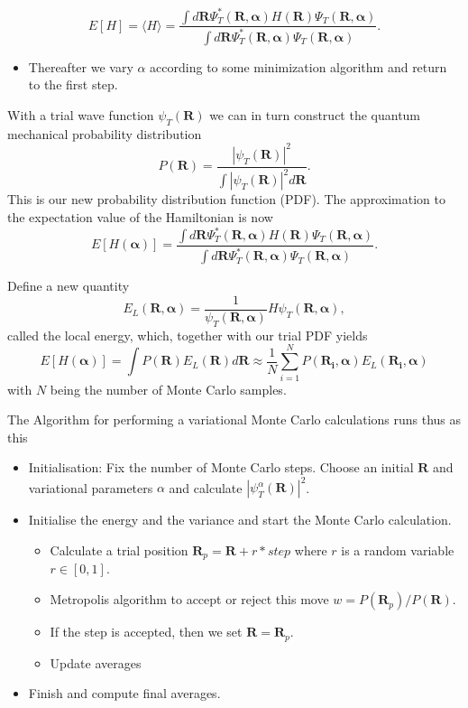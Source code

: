 \documentclass[%
oneside,                 %
final,                   %
10pt]{article}
\begin{document}
\noindent
\[
   E[H]=\langle H \rangle =
   \frac{\int d\bm{R}\Psi^{\ast}_{T}(\bm{R},\bm{\alpha})H(\bm{R})\Psi_{T}(\bm{R},\bm{\alpha})}
        {\int d\bm{R}\Psi^{\ast}_{T}(\bm{R},\bm{\alpha})\Psi_{T}(\bm{R},\bm{\alpha})}.
\]
\begin{itemize}
\item Thereafter we vary $\alpha$ according to some minimization algorithm and return to the first step.
\end{itemize}

\noindent
With a trial wave function $\psi_T(\bm{R})$ we can in turn construct the quantum mechanical probability distribution
\[
   P(\bm{R})= \frac{\left|\psi_T(\bm{R})\right|^2}{\int \left|\psi_T(\bm{R})\right|^2d\bm{R}}.
\]
This is our new probability distribution function  (PDF).
The approximation to the expectation value of the Hamiltonian is now 
\[
   E[H(\bm{\alpha})] = 
   \frac{\int d\bm{R}\Psi^{\ast}_T(\bm{R},\bm{\alpha})H(\bm{R})\Psi_T(\bm{R},\bm{\alpha})}
        {\int d\bm{R}\Psi^{\ast}_T(\bm{R},\bm{\alpha})\Psi_T(\bm{R},\bm{\alpha})}.
\]

Define a new quantity
\[
   E_L(\bm{R},\bm{\alpha})=\frac{1}{\psi_T(\bm{R},\bm{\alpha})}H\psi_T(\bm{R},\bm{\alpha}),
   \label{eq:locale1}
\]
called the local energy, which, together with our trial PDF yields
\[
  E[H(\bm{\alpha})]=\int P(\bm{R})E_L(\bm{R}) d\bm{R}\approx \frac{1}{N}\sum_{i=1}^NP(\bm{R_i},\bm{\alpha})E_L(\bm{R_i},\bm{\alpha})
  \label{eq:vmc1}
\]
with $N$ being the number of Monte Carlo samples.

The Algorithm for performing a variational Monte Carlo calculations runs thus as this

\begin{itemize}
   \item Initialisation: Fix the number of Monte Carlo steps. Choose an initial $\bm{R}$ and variational parameters $\alpha$ and calculate $\left|\psi_T^{\alpha}(\bm{R})\right|^2$. 

   \item Initialise the energy and the variance and start the Monte Carlo calculation.
\begin{itemize}

      \item Calculate  a trial position  $\bm{R}_p=\bm{R}+r*step$ where $r$ is a random variable $r \in [0,1]$.

      \item Metropolis algorithm to accept or reject this move  $w = P(\bm{R}_p)/P(\bm{R})$.

      \item If the step is accepted, then we set $\bm{R}=\bm{R}_p$. 

      \item Update averages

\end{itemize}

\noindent
   \item Finish and compute final averages.
\end{itemize}
\end{document}
